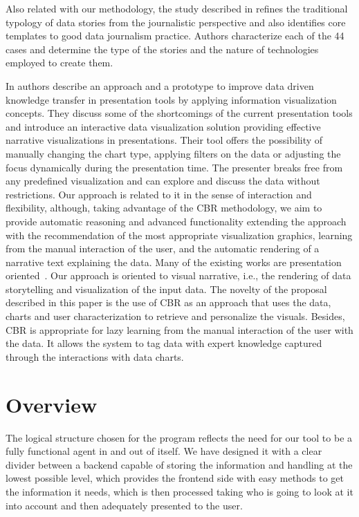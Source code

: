 Also related with our methodology, the study described in \cite{Adegboyega2017} refines the traditional typology of data stories from the journalistic perspective and also identifies core templates to good data journalism practice. Authors characterize each of the 44 cases and determine the type of the stories and the nature of technologies employed to create them. 

In \cite{Roels2017} authors describe an approach and a prototype to improve data driven knowledge transfer in presentation tools by applying information visualization concepts. They discuss some of the shortcomings of the current presentation tools and introduce an interactive data visualization solution providing effective narrative visualizations in presentations. Their tool offers the possibility of manually changing the chart type, applying filters on the data or adjusting the focus dynamically during the presentation time.
The presenter breaks free from any predefined visualization and can explore and discuss the data without restrictions. Our approach is related to it in the sense of interaction and flexibility, although, taking advantage of the CBR methodology, we aim to provide automatic reasoning and advanced functionality extending the approach with the recommendation of the most appropriate visualization graphics, learning from the manual interaction of the user,  and the automatic rendering of a narrative text explaining the data. 
Many of the existing works are presentation oriented~\cite{Kosara16,Roels2017}. Our approach is oriented to visual narrative, i.e., the rendering of data storytelling and visualization of the input data.
The novelty of the proposal described in this paper is the use of CBR as an approach that uses the data, charts and user characterization to retrieve and personalize the visuals. Besides, CBR is appropriate for lazy learning from the manual interaction of the user with the data. It allows the system to tag data with expert knowledge captured through the interactions with data charts. 


\section{Overview}
\label{cap1:sec:overview}

The logical structure chosen for the program reflects the need for our tool to be a fully functional agent in and out of itself. We have designed it with a clear divider between a backend capable of storing the information and handling at the lowest possible level, which provides the frontend side with easy methods to get the information it needs, which is then processed taking who is going to look at it into account and then adequately presented to the user.

